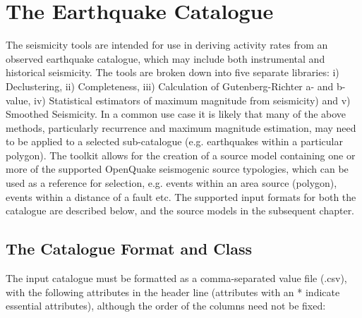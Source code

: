 \section{The Earthquake Catalogue}

The seismicity tools are intended for use in deriving activity rates from an observed earthquake catalogue, which may include both instrumental and historical seismicity. The tools are broken down into five separate libraries: i) Declustering, ii) Completeness, iii) Calculation of Gutenberg-Richter a- and b-value, iv) Statistical estimators of maximum magnitude from seismicity) and v) Smoothed Seismicity. In a common use case it is likely that many of the above methods, particularly recurrence and maximum magnitude estimation, may need to be applied to a selected sub-catalogue (e.g. earthquakes within a particular polygon). The toolkit allows for the creation of a source model containing one or more of the supported OpenQuake seismogenic source typologies, which can be used as a reference for selection, e.g. events within an area source (polygon), events within a distance of a fault etc. The supported input formats for both the catalogue are described below, and the source models in the subsequent chapter. 

\subsection{The Catalogue Format and Class}

The input catalogue must be formatted as a comma-separated value file (.csv), with the following attributes in the header line (attributes with an * indicate essential attributes), although the order of the columns need not be fixed:

